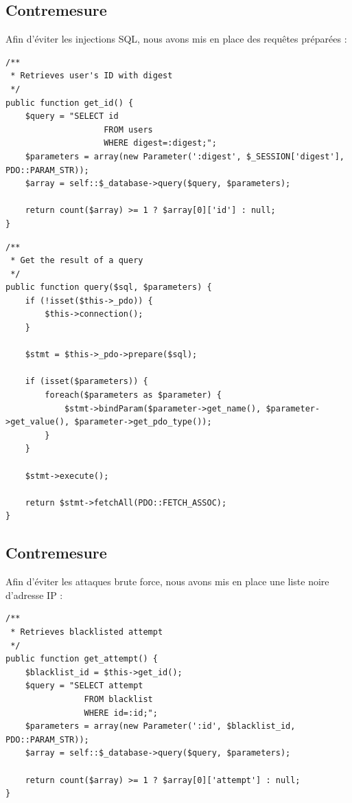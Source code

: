 \documentclass[12pt]{article}
\begin{document}
\subsection{Contremesure}\label{c5}

Afin d'éviter les injections SQL, nous avons mis en place des requêtes préparées :

\begin{lstlisting}[style=JAVA]
/**
 * Retrieves user's ID with digest
 */
public function get_id() {
    $query = "SELECT id 
                    FROM users 
                    WHERE digest=:digest;";
    $parameters = array(new Parameter(':digest', $_SESSION['digest'], PDO::PARAM_STR));
    $array = self::$_database->query($query, $parameters);

    return count($array) >= 1 ? $array[0]['id'] : null;
}
\end{lstlisting}

\begin{lstlisting}[style=JAVA]
/**
 * Get the result of a query
 */
public function query($sql, $parameters) {
    if (!isset($this->_pdo)) {
        $this->connection();
    }

    $stmt = $this->_pdo->prepare($sql);
    
    if (isset($parameters)) {
        foreach($parameters as $parameter) {
            $stmt->bindParam($parameter->get_name(), $parameter->get_value(), $parameter->get_pdo_type());
        }
    }

    $stmt->execute();

    return $stmt->fetchAll(PDO::FETCH_ASSOC);
}
\end{lstlisting}

\subsection{Contremesure}\label{c6}

Afin d'éviter les attaques brute force, nous avons mis en place une liste noire d'adresse IP :

\begin{lstlisting}[style=JAVA]
/**
 * Retrieves blacklisted attempt
 */
public function get_attempt() {
    $blacklist_id = $this->get_id();
    $query = "SELECT attempt
                FROM blacklist
                WHERE id=:id;";
    $parameters = array(new Parameter(':id', $blacklist_id, PDO::PARAM_STR));
    $array = self::$_database->query($query, $parameters);

    return count($array) >= 1 ? $array[0]['attempt'] : null;
}
\end{lstlisting}
\end{document}
